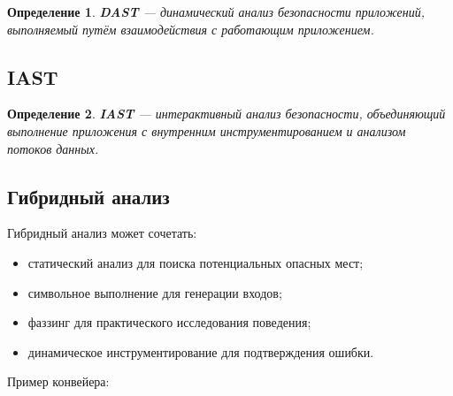 \documentclass[12pt,a4paper]{article}
\newtheorem{definition}{Определение}
\begin{document}
\begin{definition}
\textbf{DAST} --- динамический анализ безопасности приложений, выполняемый путём взаимодействия с работающим приложением.
\end{definition}

\subsection{IAST}

\begin{definition}
\textbf{IAST} --- интерактивный анализ безопасности, объединяющий выполнение приложения с внутренним инструментированием и анализом потоков данных.
\end{definition}

\subsection{Гибридный анализ}

Гибридный анализ может сочетать:

\begin{itemize}
  \item статический анализ для поиска потенциальных опасных мест;
  \item символьное выполнение для генерации входов;
  \item фаззинг для практического исследования поведения;
  \item динамическое инструментирование для подтверждения ошибки.
\end{itemize}

Пример конвейера:

\begin{center}
\end{center}
\end{document}

